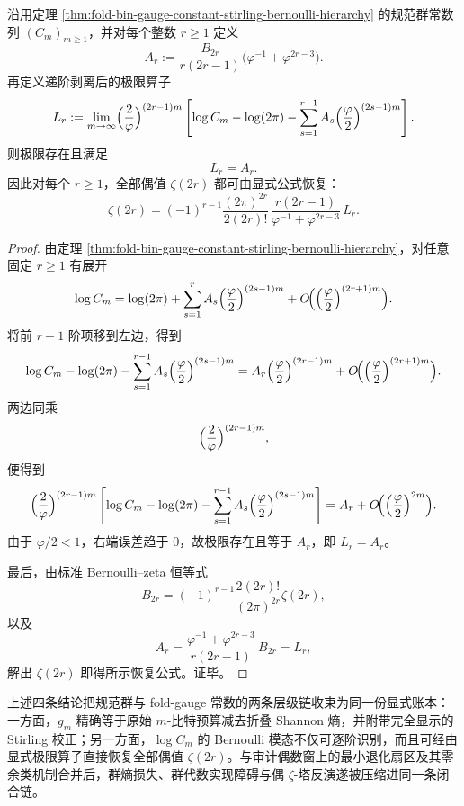 \begin{theorem}\label{thm:xi-time-part60aa-gauge-constant-explicit-even-zeta-recovery}
沿用定理 \ref{thm:fold-bin-gauge-constant-stirling-bernoulli-hierarchy} 的规范群常数列 \((C_m)_{m\ge 1}\)，并对每个整数 \(r\ge 1\) 定义
\[
A_r:=
\frac{B_{2r}}{r(2r-1)}
\bigl(\varphi^{-1}+\varphi^{2r-3}\bigr).
\]
再定义递阶剥离后的极限算子
\[
L_r:=
\lim_{m\to\infty}
\Bigl(\frac{2}{\varphi}\Bigr)^{(2r-1)m}
\left[
\log C_m-\log(2\pi)
-\sum_{s=1}^{r-1}A_s\Bigl(\frac{\varphi}{2}\Bigr)^{(2s-1)m}
\right].
\]
则极限存在且满足
\[
\boxed{\;L_r=A_r.\;}
\]
因此对每个 \(r\ge 1\)，全部偶值 \(\zeta(2r)\) 都可由显式公式恢复：
\[
\boxed{\;
\zeta(2r)
=
(-1)^{r-1}
\frac{(2\pi)^{2r}}{2(2r)!}\,
\frac{r(2r-1)}{\varphi^{-1}+\varphi^{2r-3}}\,
L_r.\;}
\]
\end{theorem}
\begin{proof}
由定理 \ref{thm:fold-bin-gauge-constant-stirling-bernoulli-hierarchy}，对任意固定 \(r\ge 1\) 有展开
\[
\log C_m
=
\log(2\pi)
+\sum_{s=1}^{r}A_s\Bigl(\frac{\varphi}{2}\Bigr)^{(2s-1)m}
+O\!\Bigl(\Bigl(\frac{\varphi}{2}\Bigr)^{(2r+1)m}\Bigr).
\]
将前 \(r-1\) 阶项移到左边，得到
\[
\log C_m-\log(2\pi)
-\sum_{s=1}^{r-1}A_s\Bigl(\frac{\varphi}{2}\Bigr)^{(2s-1)m}
=
A_r\Bigl(\frac{\varphi}{2}\Bigr)^{(2r-1)m}
+O\!\Bigl(\Bigl(\frac{\varphi}{2}\Bigr)^{(2r+1)m}\Bigr).
\]
两边同乘
\[
\Bigl(\frac{2}{\varphi}\Bigr)^{(2r-1)m},
\]
便得到
\[
\Bigl(\frac{2}{\varphi}\Bigr)^{(2r-1)m}
\left[
\log C_m-\log(2\pi)
-\sum_{s=1}^{r-1}A_s\Bigl(\frac{\varphi}{2}\Bigr)^{(2s-1)m}
\right]
=
A_r
+O\!\Bigl(\Bigl(\frac{\varphi}{2}\Bigr)^{2m}\Bigr).
\]
由于 \(\varphi/2<1\)，右端误差趋于 \(0\)，故极限存在且等于 \(A_r\)，即 \(L_r=A_r\)。

最后，由标准 Bernoulli--zeta 恒等式
\[
B_{2r}
=
(-1)^{r-1}\frac{2(2r)!}{(2\pi)^{2r}}\zeta(2r),
\]
以及
\[
A_r=
\frac{\varphi^{-1}+\varphi^{2r-3}}{r(2r-1)}\,B_{2r}
=L_r,
\]
解出 \(\zeta(2r)\) 即得所示恢复公式。证毕。
\end{proof}

\noindent
上述四条结论把规范群与 fold-gauge 常数的两条层级链收束为同一份显式账本：一方面，\(g_m\) 精确等于原始 \(m\)-比特预算减去折叠 Shannon 熵，并附带完全显示的 Stirling 校正；另一方面，\(\log C_m\) 的 Bernoulli 模态不仅可逐阶识别，而且可经由显式极限算子直接恢复全部偶值 \(\zeta(2r)\)。与审计偶数窗上的最小退化扇区及其零余类机制合并后，群熵损失、群代数实现障碍与偶 \(\zeta\)-塔反演遂被压缩进同一条闭合链。

\endinput
